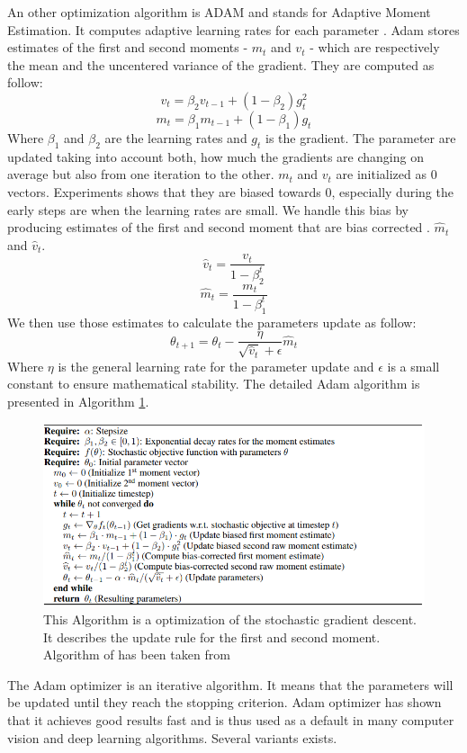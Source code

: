An other optimization algorithm is ADAM and stands for Adaptive Moment Estimation. It computes adaptive learning rates for each parameter . Adam stores estimates of the first and second moments - \(m_t\) and \(v_t\) - which are respectively the mean and the uncentered variance of the gradient. They are computed as follow: \[ v_t = \beta_2 v_{t-1} + (1 - \beta_2)g_t^2 \] \[m_t = \beta_1 m_{t-1} + (1 - \beta_1)g_t \]
Where \(\beta_1\) and \(\beta_2\) are the learning rates and \(g_t\) is the gradient. The parameter are updated taking into account both, how much the gradients are changing on average but also from one iteration to the other.  \(m_t\) and \(v_t\) are initialized as 0 vectors. Experiments shows that they are biased towards 0, especially during the early steps are when the learning rates are small. We handle this bias by producing estimates of the first and second moment that are bias corrected \cite{adam}. \(\hat{m}_t\) and \(\hat{v}_t\). 
\[ \hat{v}_t=  \frac{v_{t}}{1 - \beta_2^t}\] 
\[\hat{m}_t=  \frac{m_{t}}{1 - \beta_1^t}\] 
We then use those estimates to calculate the parameters update as follow: \[\theta_{t+1} = \theta_t - \frac{\eta}{\sqrt{\hat{v}_t} + \epsilon}\hat{m}_t\]
Where \(\eta\) is the general learning rate for the parameter update and \(\epsilon\) is a small constant to ensure mathematical stability. 
The detailed  Adam algorithm is presented in Algorithm \ref{fig:adam_algo}.
\begin{figure}[!htp]
    \centering
        \includegraphics[width=1\textwidth]{figures/02-adam_algo}
        \caption[Adam Algorithm]{ This Algorithm is a optimization of the stochastic gradient descent. It describes the update rule for the first and second moment. Algorithm of has been taken from \cite{adam}}\label{fig:adam_algo}
\end{figure}
The Adam optimizer is an iterative algorithm. It means that the parameters will be updated until they reach the stopping criterion. 
Adam optimizer has shown that it achieves good results fast and is thus used as a default in many 
computer vision and deep learning algorithms. Several variants exists.

